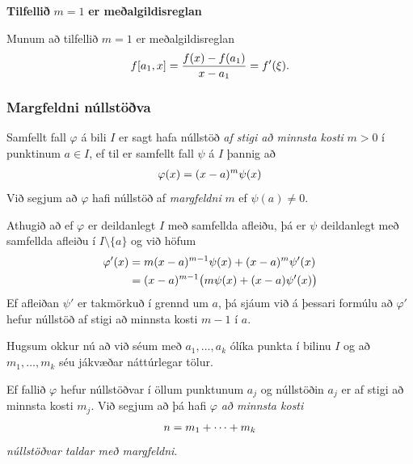 \documentclass[a4paper,10pt,icelandic]{sphinxmanual}
\begin{document}
\textbf{Tilfellið} \(m=1\) \textbf{er meðalgildisreglan}

Munum að tilfellið \(m=1\) er meðalgildisreglan
\begin{gather}
\begin{split}f[a_1,x]=\dfrac{f(x)-f(a_1)}{x-a_1}=f'(\xi).\end{split}\notag
\end{gather}

\subsubsection{Margfeldni núllstöðva}
\label{kafli03:margfeldni-nullstova}
Samfellt fall \(\varphi\) á bili \(I\) er sagt hafa núllstöð \emph{af
stigi að minnsta kosti} \(m>0\) í punktinum \(a\in I\), ef til
er samfellt fall \(\psi\) á \(I\) þannig að
\begin{gather}
\begin{split}\varphi(x)=(x-a)^m\psi(x)\end{split}\notag
\end{gather}
Við segjum að \(\varphi\) hafi núllstöð af \emph{margfeldni} \(m\) ef
\(\psi(a)\neq0\).

Athugið að ef \(\varphi\) er deildanlegt \(I\) með samfellda
afleiðu, þá er \(\psi\) deildanlegt með samfellda afleiðu í
\(I\setminus\{a\}\) og við höfum
\begin{gather}
\begin{split}\begin{aligned}
  \varphi'(x)&=m(x-a)^{m-1}\psi(x)+(x-a)^m\psi'(x)\\
&= (x-a)^{m-1} \big(m\psi(x)+(x-a)\psi'(x)\big)\end{aligned}\end{split}\notag
\end{gather}
Ef afleiðan \(\psi'\) er takmörkuð í grennd um \(a\), þá sjáum
við á þessari formúlu að \(\varphi'\) hefur núllstöð af stigi að
minnsta kosti \(m-1\) í \(a\).

Hugsum okkur nú að við séum með \(a_1,\dots,a_k\) ólíka punkta í
bilinu \(I\) og að \(m_1,\dots,m_k\) séu jákvæðar náttúrlegar
tölur.

Ef fallið \(\varphi\) hefur núllstöðvar í öllum punktunum
\(a_j\) og núllstöðin \(a_j\) er af stigi að minnsta kosti
\(m_j\). Við segjum að þá hafi \(\varphi\) \emph{að minnsta kosti}
\begin{gather}
\begin{split}n=m_1+\cdots+m_k\end{split}\notag
\end{gather}
\emph{núllstöðvar taldar með margfeldni}.
\end{document}
